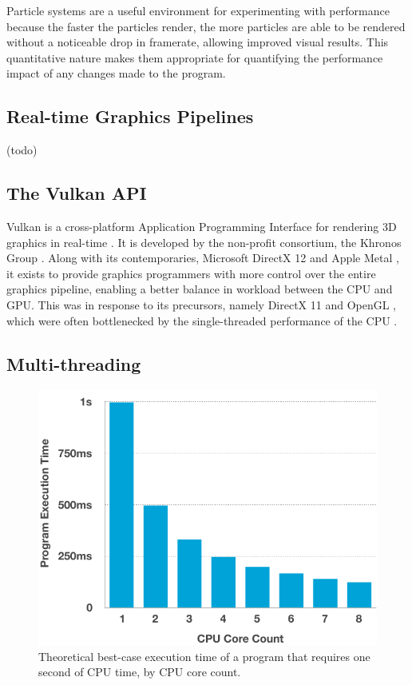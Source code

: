 \documentclass[11pt, a4paper, twocolumn]{article}
\begin{document}
Particle systems are a useful environment for experimenting with performance because the faster the particles render, the more particles are able to be rendered without a noticeable drop in framerate, allowing improved visual results. This quantitative nature makes them appropriate for quantifying the performance impact of any changes made to the program.

\subsection{Real-time Graphics Pipelines}

(todo)

\subsection{The Vulkan API}

Vulkan is a cross-platform Application Programming Interface for rendering 3D graphics in real-time \citep{Vulkan}. It is developed by the non-profit consortium, the Khronos Group \citep{Khronos}. Along with its contemporaries, Microsoft DirectX 12 \citep{dX12} and Apple Metal \citep{AppleMetal}, it exists to provide graphics programmers with more control over the entire graphics pipeline, enabling a better balance in workload between the CPU and GPU. This was in response to its precursors, namely DirectX 11 \citep{dx11} and OpenGL \citep{OpenGL}, which were often bottlenecked by the single-threaded performance of the CPU \citep{CpuBottleneck}.


\subsection{Multi-threading}

\begin{figure}[h]
\includegraphics[width=\linewidth]{cpu_cores}
\caption{Theoretical best-case execution time of a program that requires one second of CPU time, by CPU core count.}
\label{fig:cpu_cores}
\end{figure}
\end{document}
